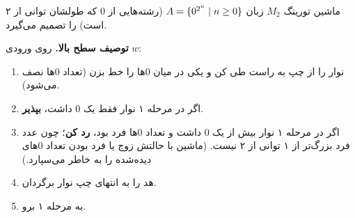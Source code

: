 \begin{example}
ماشین تورینگ $M_2$ زبان $A=\{0^{2^n}\mid n\ge0\}$ (رشته‌هایی از $0$ که طولشان توانی از ۲ است) را تصمیم می‌گیرد.

\textbf{توصیف سطح بالا.} روی ورودی $w$:
\begin{enumerate}
\item نوار را از چپ به راست طی کن و یکی در میان $0$ها را خط بزن (تعداد $0$ها نصف می‌شود).
\item اگر در مرحله ۱ نوار فقط یک $0$ داشت، \textbf{بپذیر}.
\item اگر در مرحله ۱ نوار بیش از یک $0$ داشت و تعداد $0$ها فرد بود، \textbf{رد کن}؛ چون عدد فرد بزرگ‌تر از ۱ توانی از ۲ نیست. (ماشین با حالتش زوج یا فرد بودن تعداد $0$های دیده‌شده را به خاطر می‌سپارد.)
\item هد را به انتهای چپ نوار برگردان.
\item به مرحله ۱ برو.
\end{enumerate}


\end{example}
